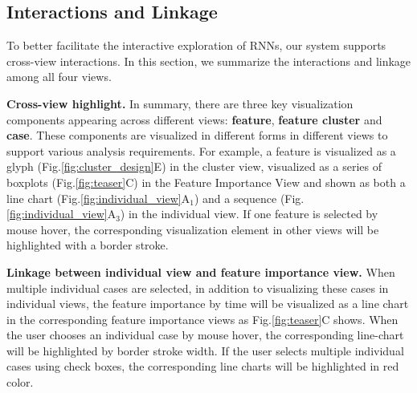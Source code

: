 \subsection{Interactions and Linkage}
To better facilitate the interactive exploration of RNNs, our system supports cross-view interactions. In this section, we summarize the interactions and linkage among all four views.

\textbf{Cross-view highlight.} 
In summary, there are three key visualization components appearing across different views: \textbf{feature}, \textbf{feature cluster} and \textbf{case}. These components are visualized in different forms in different views to support various analysis requirements. For example, a feature is visualized as a glyph (Fig.\ref{fig:cluster_design}E) in the cluster view,  visualized as a series of boxplots (Fig.\ref{fig:teaser}C) in the Feature Importance View and shown as both a line chart (Fig.\ref{fig:individual_view}A$_1$) and a sequence (Fig.\ref{fig:individual_view}A$_3$) in the individual view. If one feature is selected by mouse hover, the corresponding visualization element in other views will be highlighted with a border stroke.

\textbf{Linkage between individual view and feature importance view.} 
When multiple individual cases are selected, in addition to visualizing these cases in individual views, the feature importance by time will be visualized as a line chart in the corresponding feature importance views as Fig.\ref{fig:teaser}C shows. When the user chooses an individual case by mouse hover, the corresponding line-chart will be highlighted by border stroke width. If the user selects multiple individual cases using check boxes, the corresponding line charts will be highlighted in red color.


